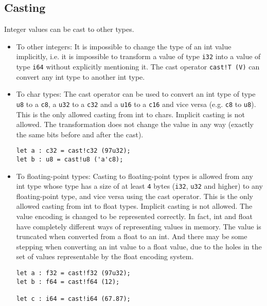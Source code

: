 \subsection{Casting}
\label{sec:orgfdc3d25}

Integer values can be cast to other types.

\begin{itemize}
\item To other integers: It is impossible to change the type of an int value
implicitly, i.e. it is impossible to transform a value of type \texttt{i32} into
a value of type \texttt{i64} without explicitly mentioning it. The cast operator
\texttt{cast!T (V)} can convert any int type to another int type.


\item To char types: The cast operator can be used to convert an int type of
  type \texttt{u8} to a \texttt{c8}, a \texttt{u32} to a \texttt{c32} and a
  \texttt{u16} to a \texttt{c16} and vice versa (e.g. \texttt{c8} to
  \texttt{u8}). This is the only allowed casting from int to chars. Implicit
  casting is not allowed. The transformation does not change the value in any
  way (exactly the same bits before and after the cast).

  \begin{lstlisting}[style=coloredverbatim]
let a : c32 = cast!c32 (97u32);
let b : u8 = cast!u8 ('a'c8);
  \end{lstlisting}

\item To floating-point types: Casting to floating-point types is allowed from
  any int type whose type has a size of at least \texttt{4} bytes (\texttt{i32},
  \texttt{u32} and higher) to any floating-point type, and vice versa using the
  cast operator. This is the only allowed casting from int to float types.
  Implicit casting is not allowed. The value encoding is changed to be
  represented correctly. In fact, int and float have completely different ways
  of representing values in memory. The value is truncated when converted from a
  float to an int. And there may be some stepping when converting an int value
  to a float value, due to the holes in the set of values representable by the
  float encoding system.
  \smallskip

  \begin{lstlisting}[style=coloredverbatim]
let a : f32 = cast!f32 (97u32);
let b : f64 = cast!f64 (12);

let c : i64 = cast!i64 (67.87);
  \end{lstlisting}

\end{itemize}

